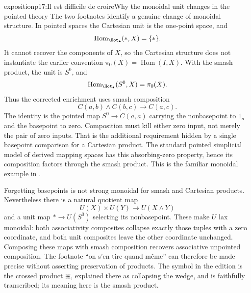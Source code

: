\begin{dcomment}{exposition}{p17:Il est difficile de croire}{Why the monoidal unit changes in the pointed theory}
The two footnotes identify a genuine change of monoidal structure. In pointed spaces the Cartesian unit is the one-point space, and
\[
 \operatorname{Hom}_{\Hot_\bullet}(*,X)=\{*\}.
\]
It cannot recover the components of $X$, so the Cartesian structure does not instantiate the earlier convention $\pi_0(X)=\operatorname{Hom}(I,X)$. With the smash product, the unit is $S^0$, and
\[
 \operatorname{Hom}_{\Hot_\bullet}(S^0,X)=\pi_0(X).
\]
Thus the corrected enrichment uses smash composition
\[
 C(a,b)\wedge C(b,c)\longrightarrow C(a,c).
\]
The identity is the pointed map $S^0\to C(a,a)$ carrying the nonbasepoint to $1_a$ and the basepoint to zero. Composition must kill either zero input, not merely the pair of zero inputs. That is the additional requirement hidden by a single basepoint comparison for a Cartesian product. The standard pointed simplicial model of derived mapping spaces has this absorbing-zero property, hence its composition factors through the smash product. This is the familiar monoidal example in \citet[\S1.1]{Kelly1982}.

Forgetting basepoints is not strong monoidal for smash and Cartesian products. Nevertheless there is a natural quotient map
\[
 U(X)\times U(Y)\longrightarrow U(X\wedge Y)
\]
and a unit map $*\to U(S^0)$ selecting its nonbasepoint. These make $U$ lax monoidal: both associativity composites collapse exactly those tuples with a zero coordinate, and both unit composites leave the other coordinate unchanged. Composing these maps with smash composition recovers associative unpointed composition. The footnote ``on s'en tire quand m\^eme'' can therefore be made precise without asserting preservation of products. The symbol in the edition is the crossed product $\divideontimes$, explained there as collapsing the wedge, and is faithfully transcribed; its meaning here is the smash product.
\end{dcomment}

